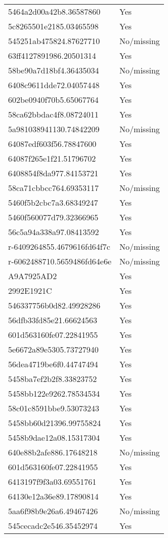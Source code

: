 \begin{tabular}{ll}
5464a2d00a42b8.36587860 & Yes \\
5c8265501e2185.03465598 & Yes \\
545251ab475824.87627710 & No/missing \\
63ff4127891986.20501314 & Yes \\
58be90a7d18bf4.36435034 & No/missing \\
6408c9611dde72.04057448 & Yes \\
602be0940f70b5.65067764 & Yes \\
58ca62bbdac4f8.08724011 & Yes \\
5a981038941130.74842209 & No/missing \\
64087edf603f56.78847600 & Yes \\
64087f265e1f21.51796702 & Yes \\
6408854f8da977.84153721 & Yes \\
58ca71cbbcc764.69353117 & No/missing \\
5460f5b2cbc7a3.68349247 & Yes \\
5460f560077d79.32366965 & Yes \\
56c5a94a338a97.08413592 & Yes \\
r-6409264855.4679616fd64f7c & No/missing \\
r-6062488710.5659486fd64e6e & No/missing \\
A9A7925AD2 & Yes \\
2992E1921C & Yes \\
546337756b0d82.49928286 & Yes \\
56dfb33fd85e21.66624563 & Yes \\
601d563160fe07.22841955 & Yes \\
5e6672a89e5305.73727940 & Yes \\
56dea4719be6f0.44747494 & Yes \\
5458ba7ef2b2f8.33823752 & Yes \\
5458bb122e9262.78534534 & Yes \\
58c01c8591bbe9.53073243 & Yes \\
5458bb60d21396.99755824 & Yes \\
5458b9dae12a08.15317304 & Yes \\
640e88b2afe886.17648218 & No/missing \\
601d563160fe07.22841955 & Yes \\
6413197f9f3a03.69551761 & Yes \\
64130e12a36e89.17890814 & Yes \\
5aa6f98b9e26a6.49467426 & No/missing \\
545cecadc2e546.35452974 & Yes \\

\end{tabular}
